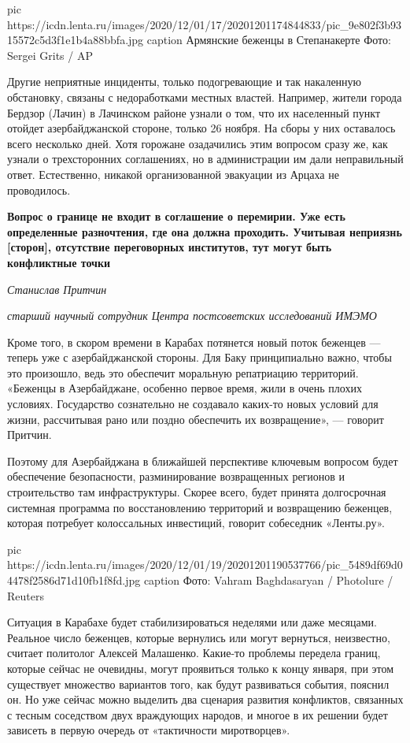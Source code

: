 \ifcmt
pic https://icdn.lenta.ru/images/2020/12/01/17/20201201174844833/pic_9e802f3b9315572c5d3f1e1b4a88bbfa.jpg
caption Армянские беженцы в Степанакерте Фото: Sergei Grits / AP
\fi

Другие неприятные инциденты, только подогревающие и так накаленную обстановку,
связаны с недоработками местных властей. Например, жители города Бердзор
(Лачин) в Лачинском районе узнали о том, что их населенный пункт отойдет
азербайджанской стороне, только 26 ноября. На сборы у них оставалось всего
несколько дней. Хотя горожане озадачились этим вопросом сразу же, как узнали о
трехсторонних соглашениях, но в администрации им дали неправильный ответ.
Естественно, никакой организованной эвакуации из Арцаха не проводилось.

\begin{leftbar}
	\bfseries
Вопрос о границе не входит в соглашение о перемирии. Уже есть определенные
разночтения, где она должна проходить. Учитывая неприязнь [сторон], отсутствие
переговорных институтов, тут могут быть конфликтные точки\par
				\emph{Станислав Притчин}\par
				\emph{старший научный сотрудник Центра постсоветских исследований ИМЭМО}
\end{leftbar}

Кроме того, в скором времени в Карабах потянется новый поток беженцев — теперь
уже с азербайджанской стороны. Для Баку принципиально важно, чтобы это
произошло, ведь это обеспечит моральную репатриацию территорий. «Беженцы в
Азербайджане, особенно первое время, жили в очень плохих условиях. Государство
сознательно не создавало каких-то новых условий для жизни, рассчитывая рано или
поздно обеспечить их возвращение», — говорит Притчин.

Поэтому для Азербайджана в ближайшей перспективе ключевым вопросом будет
обеспечение безопасности, разминирование возвращенных регионов и строительство
там инфраструктуры. Скорее всего, будет принята долгосрочная системная
программа по восстановлению территорий и возвращению беженцев, которая
потребует колоссальных инвестиций, говорит собеседник «Ленты.ру».

\ifcmt
pic https://icdn.lenta.ru/images/2020/12/01/19/20201201190537766/pic_5489df69d04478f2586d71d10fb1f8fd.jpg
caption Фото: Vahram Baghdasaryan / Photolure / Reuters
\fi

Ситуация в Карабахе будет стабилизироваться неделями или даже месяцами.
Реальное число беженцев, которые вернулись или могут вернуться, неизвестно,
считает политолог Алексей Малашенко. Какие-то проблемы передела границ, которые
сейчас не очевидны, могут проявиться только к концу января, при этом существует
множество вариантов того, как будут развиваться события, пояснил он. Но уже
сейчас можно выделить два сценария развития конфликтов, связанных с тесным
соседством двух враждующих народов, и многое в их решении будет зависеть в
первую очередь от «тактичности миротворцев».

